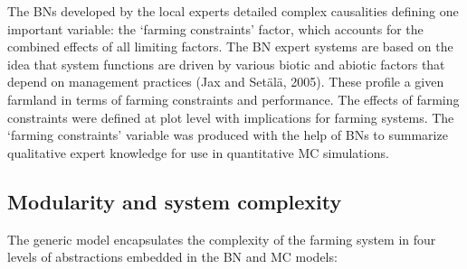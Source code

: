 \documentclass[]{elsarticle} %
\begin{document}
The BNs developed by the local experts detailed complex causalities defining one important variable: the `farming constraints' factor, which accounts for the combined effects of all limiting factors. The BN expert systems are based on the idea that system functions are driven by various biotic and abiotic factors that depend on management practices (Jax and Setälä, 2005). These profile a given farmland in terms of farming constraints and performance. The effects of farming constraints were defined at plot level with implications for farming systems. The `farming constraints' variable was produced with the help of BNs to summarize qualitative expert knowledge for use in quantitative MC simulations.

\hypertarget{ref34}{%
\subsection{Modularity and system complexity}\label{ref34}}

The generic model encapsulates the complexity of the farming system in four levels of abstractions embedded in the BN and MC models:
\end{document}
